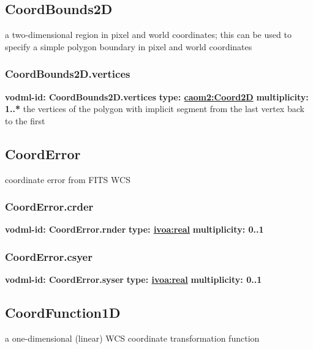   \subsection{CoordBounds2D}
  \label{sect:CoordBounds2D}
    a two-dimensional region in pixel and world coordinates; this can be used to specify a simple polygon boundary in pixel and world coordinates

    \subsubsection{CoordBounds2D.vertices}
      \textbf{vodml-id: CoordBounds2D.vertices} \newline
      \textbf{type: \hyperref[sect:Coord2D]{caom2:Coord2D}} \newline
      \textbf{multiplicity: 1..*} \newline
      the vertices of the polygon with implicit segment from the last vertex back to the first

  \subsection{CoordError}
  \label{sect:CoordError}
    coordinate error from FITS WCS

    \subsubsection{CoordError.crder}
      \textbf{vodml-id: CoordError.rnder} \newline
      \textbf{type: \hyperref[sect:ivoa]{ivoa:real}} \newline
      \textbf{multiplicity: 0..1} 

    \subsubsection{CoordError.csyer}
      \textbf{vodml-id: CoordError.syser} \newline
      \textbf{type: \hyperref[sect:ivoa]{ivoa:real}} \newline
      \textbf{multiplicity: 0..1} 

  \subsection{CoordFunction1D}
  \label{sect:CoordFunction1D}
    a one-dimensional (linear) WCS coordinate transformation function

